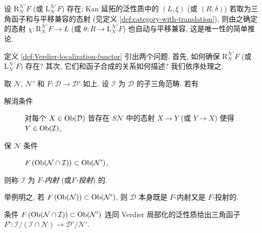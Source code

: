 \begin{remark}\label{rem:derived-can-morphism}
	设 $\mathrm{R}^{\mathcal{N}'}_{\mathcal{N}} F$ (或 $\mathrm{L}^{\mathcal{N}'}_{\mathcal{N}} F$) 存在; Kan 延拓的泛性质中的 $(L, \xi)$ (或 $(R, \delta)$) 若取为三角函子和与平移兼容的态射 (见定义 \ref{def:category-with-translation}), 则由之确定的态射 $\chi: \mathrm{R}^{\mathcal{N}'}_{\mathcal{N}} F \to L$ (或 $\theta: R \to \mathrm{L}^{\mathcal{N}'}_{\mathcal{N}} F$) 也自动与平移兼容, 这是唯一性的简单推论.
\end{remark}

定义 \ref{def:Verdier-localization-functor} 引出两个问题. 首先, 如何确保 $\mathrm{R}^{\mathcal{N}'}_{\mathcal{N}} F$ (或 $\mathrm{L}^{\mathcal{N}'}_{\mathcal{N}} F$) 存在? 其次, 它们和函子合成的关系如何描述? 我们依序处理之.

\begin{definition}\label{def:F-injective}
	取 $\mathcal{N}$, $\mathcal{N}'$ 和 $F: \mathcal{D} \to \mathcal{D}'$ 如上. 设 $\mathcal{I}$ 为 $\mathcal{D}$ 的子三角范畴. 若有
	\begin{description}
		\item[解消条件] 对每个 $X \in \operatorname{Ob}(\mathcal{D})$ 皆存在 $S\mathcal{N}$ 中的态射 $X \to Y$ (或 $Y \to X$) 使得 $Y \in \operatorname{Ob}(\mathcal{I})$,
		\item[保 $\mathcal{N}$ 条件] $F\left( \operatorname{Ob}(\mathcal{N} \cap \mathcal{I}) \right) \subset \operatorname{Ob}(\mathcal{N}')$,
	\end{description}
	则称 $\mathcal{I}$ 为 \emph{$F$-内射} (或\emph{$F$-投射}) 的.
\end{definition}

举例明之, 若 $F\left(\operatorname{Ob}(\mathcal{N})\right) \subset \operatorname{Ob}(\mathcal{N'})$, 则 $\mathcal{D}$ 本身既是 $F$-内射又是 $F$-投射的.

条件 $F\left( \operatorname{Ob}(\mathcal{N} \cap \mathcal{I}) \right) \subset \operatorname{Ob}(\mathcal{N}')$ 连同 Verdier 局部化的泛性质给出三角函子 $F^\flat: \mathcal{I}/(\mathcal{I} \cap \mathcal{N}) \to \mathcal{D}'/\mathcal{N}'$.

